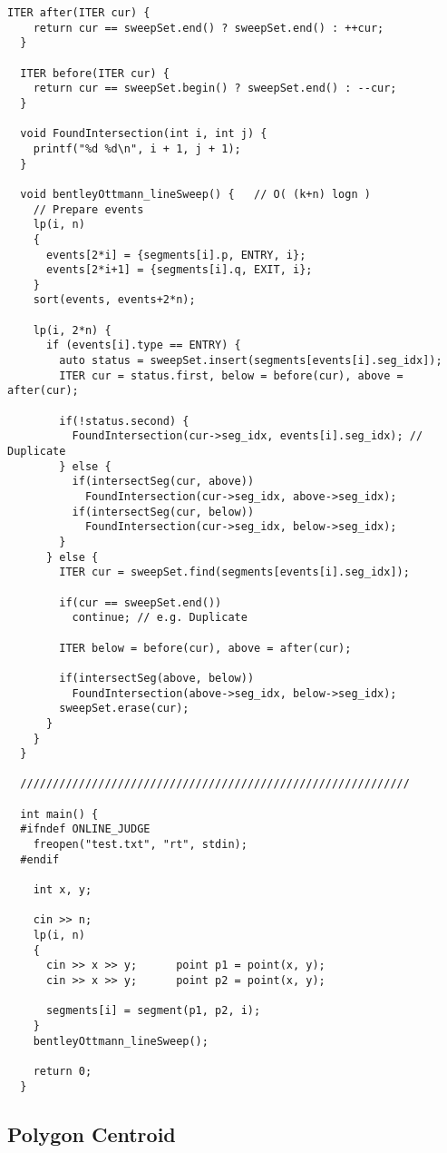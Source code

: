 \begin{lstlisting}[style=cpp]
  ITER after(ITER cur) {
    return cur == sweepSet.end() ? sweepSet.end() : ++cur;
  }

  ITER before(ITER cur) {
    return cur == sweepSet.begin() ? sweepSet.end() : --cur;
  }

  void FoundIntersection(int i, int j) {
    printf("%d %d\n", i + 1, j + 1);
  }

  void bentleyOttmann_lineSweep() {   // O( (k+n) logn )
    // Prepare events
    lp(i, n)
    {
      events[2*i] = {segments[i].p, ENTRY, i};
      events[2*i+1] = {segments[i].q, EXIT, i};
    }
    sort(events, events+2*n);

    lp(i, 2*n) {
      if (events[i].type == ENTRY) {
        auto status = sweepSet.insert(segments[events[i].seg_idx]);
        ITER cur = status.first, below = before(cur), above = after(cur);

        if(!status.second) {
          FoundIntersection(cur->seg_idx, events[i].seg_idx); // Duplicate
        } else {
          if(intersectSeg(cur, above))
            FoundIntersection(cur->seg_idx, above->seg_idx);
          if(intersectSeg(cur, below))
            FoundIntersection(cur->seg_idx, below->seg_idx);
        }
      } else {
        ITER cur = sweepSet.find(segments[events[i].seg_idx]);

        if(cur == sweepSet.end())
          continue; // e.g. Duplicate

        ITER below = before(cur), above = after(cur);

        if(intersectSeg(above, below))
          FoundIntersection(above->seg_idx, below->seg_idx);
        sweepSet.erase(cur);
      }
    }
  }

  ////////////////////////////////////////////////////////////

  int main() {
  #ifndef ONLINE_JUDGE
    freopen("test.txt", "rt", stdin);
  #endif

    int x, y;

    cin >> n;
    lp(i, n)
    {
      cin >> x >> y;      point p1 = point(x, y);
      cin >> x >> y;      point p2 = point(x, y);

      segments[i] = segment(p1, p2, i);
    }
    bentleyOttmann_lineSweep();

    return 0;
  }
\end{lstlisting}

\subsection{Polygon Centroid}

